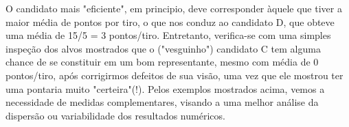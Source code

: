 \begin{figure}[!htb]
\end{figure}

\newpage

O candidato mais "eficiente", em principio, deve corresponder àquele que tiver a maior média de pontos por tiro, o que nos conduz ao candidato D, que obteve uma média de 15/5 = 3 pontos/tiro.  Entretanto, verifica-se com uma simples inspeção dos alvos mostrados que o ("vesguinho") candidato C tem alguma chance de se constituir em um bom representante, mesmo com média de 0 pontos/tiro, após corrigirmos defeitos de sua visão, uma vez que ele mostrou ter uma pontaria muito "certeira"(!).  Pelos exemplos mostrados acima, vemos a necessidade de medidas complementares, visando a uma melhor análise da dispersão ou variabilidade dos resultados numéricos.\vskip0.3cm



